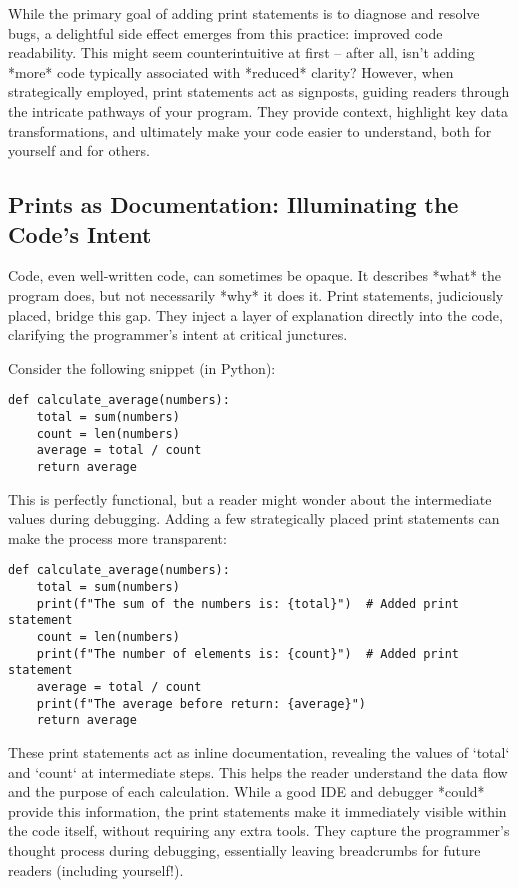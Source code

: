 \documentclass{article}
\begin{document}
{{{{While the primary goal of adding print statements is to diagnose and resolve bugs, a delightful side effect emerges from this practice: improved code readability. This might seem counterintuitive at first – after all, isn't adding *more* code typically associated with *reduced* clarity? However, when strategically employed, print statements act as signposts, guiding readers through the intricate pathways of your program. They provide context, highlight key data transformations, and ultimately make your code easier to understand, both for yourself and for others.

\subsection*{Prints as Documentation: Illuminating the Code's Intent}

Code, even well-written code, can sometimes be opaque. It describes *what* the program does, but not necessarily *why* it does it. Print statements, judiciously placed, bridge this gap. They inject a layer of explanation directly into the code, clarifying the programmer's intent at critical junctures.

Consider the following snippet (in Python):

\begin{verbatim}
def calculate_average(numbers):
    total = sum(numbers)
    count = len(numbers)
    average = total / count
    return average
\end{verbatim}

This is perfectly functional, but a reader might wonder about the intermediate values during debugging. Adding a few strategically placed print statements can make the process more transparent:

\begin{verbatim}
def calculate_average(numbers):
    total = sum(numbers)
    print(f"The sum of the numbers is: {total}")  # Added print statement
    count = len(numbers)
    print(f"The number of elements is: {count}")  # Added print statement
    average = total / count
    print(f"The average before return: {average}")
    return average
\end{verbatim}

These print statements act as inline documentation, revealing the values of `total` and `count` at intermediate steps. This helps the reader understand the data flow and the purpose of each calculation. While a good IDE and debugger *could* provide this information, the print statements make it immediately visible within the code itself, without requiring any extra tools. They capture the programmer's thought process during debugging, essentially leaving breadcrumbs for future readers (including yourself!).

}}}}
\end{document}
